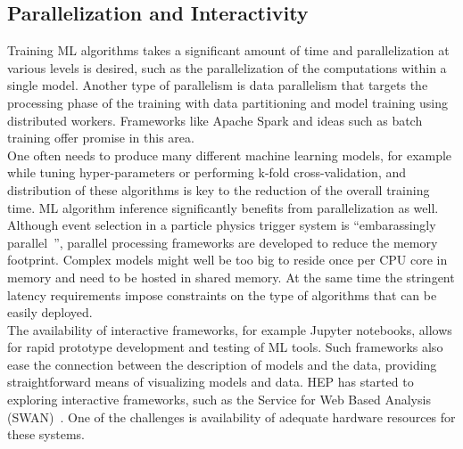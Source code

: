 \subsection{Parallelization and Interactivity}
Training ML algorithms takes a significant amount of time and parallelization at various levels is desired, such as the parallelization of the computations within a single model. Another type of parallelism is data parallelism that targets the processing phase of the training with data partitioning and model training using distributed workers. Frameworks like Apache Spark and ideas such as batch training offer promise in this area.\\

One often needs to produce many different machine learning models, for example while tuning hyper-parameters or performing k-fold cross-validation, and distribution of these algorithms is key to the reduction of the overall training time.
ML algorithm inference significantly benefits from parallelization as well. Although event selection in a particle physics trigger system is ``embarassingly parallel~\cite{embarrassingly}'', parallel processing frameworks are developed to reduce the memory footprint. Complex models might well be too big to reside once per CPU core in memory and need to be hosted in shared memory. At the same time the stringent latency requirements impose constraints on the type of algorithms that can be easily deployed.\\

The availability of interactive frameworks, for example Jupyter notebooks, allows for rapid prototype development and testing of ML tools. Such frameworks also ease the connection between the description of models and the data, providing straightforward means of visualizing models and data.
HEP has started to exploring interactive frameworks, such as the Service for Web Based Analysis (SWAN)~\cite{swan}. One of the challenges is availability of adequate hardware resources for these systems.


